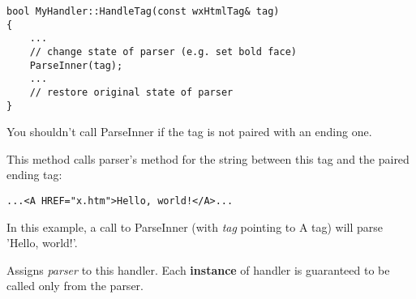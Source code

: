 \begin{verbatim}
bool MyHandler::HandleTag(const wxHtmlTag& tag)
{
    ...
    // change state of parser (e.g. set bold face)
    ParseInner(tag);
    ...
    // restore original state of parser
}
\end{verbatim}

You shouldn't call ParseInner if the tag is not paired with an ending one.

\label{wxhtmltaghandlerparseinner}


This method calls parser's  method
for the string between this tag and the paired ending tag:

\begin{verbatim}
...<A HREF="x.htm">Hello, world!</A>...
\end{verbatim}

In this example, a call to ParseInner (with {\it tag} pointing to A tag)
will parse 'Hello, world!'.

\label{wxhtmltaghandlersetparser}


Assigns {\it parser} to this handler. Each {\bf instance} of handler 
is guaranteed to be called only from the parser.

